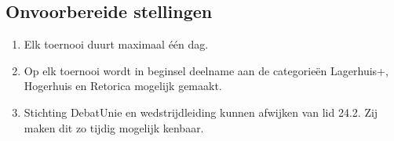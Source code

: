 \subsection{Onvoorbereide stellingen}

\begin{enumerate}
\item Elk toernooi duurt maximaal één dag.
\item Op elk toernooi wordt in beginsel deelname aan de categorieën Lagerhuis+, Hogerhuis en Retorica mogelijk gemaakt.
\item Stichting DebatUnie en wedstrijdleiding kunnen afwijken van lid 24.2. Zij maken dit zo tijdig mogelijk kenbaar.
\end{enumerate}
